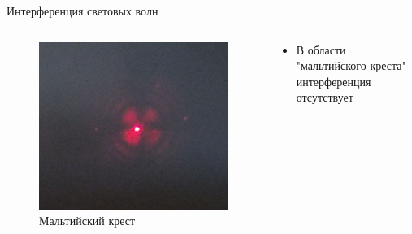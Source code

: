 \documentclass[11pt]{beamer} %
\begin{document}
    \begin{frame}{Интерференция световых волн}

        \begin{columns}
            \begin{column}{0.5\textwidth}
                \begin{figure}
                    \centering
                    \includegraphics[width = \textwidth]{images/image.png}
                        \caption{Мальтийский крест}
                        \label{fig:enter-label}
                    \end{figure}
            \end{column}

            \begin{column}{0.5\textwidth}
                \begin{itemize}
                    \item В области "мальтийского креста" интерференция отсутствует
                \end{itemize}
            \end{column}
        \end{columns}
        
    \end{frame}
\end{document}
